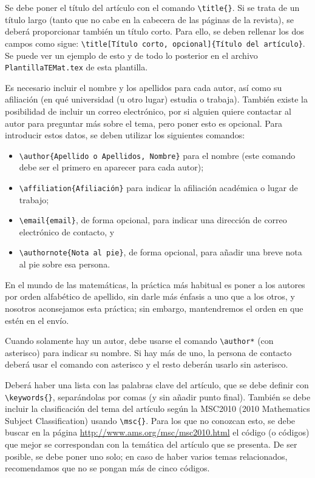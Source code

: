 \documentclass[bibtex, anon]{TEMat-article}
\begin{document}
Se debe poner el título del artículo con el comando \verb+\title{}+.
Si se trata de un título largo (tanto que no cabe en la cabecera de las páginas de la revista), se deberá proporcionar también un título corto.
Para ello, se deben rellenar los dos campos como sigue: \verb+\title[Título corto, opcional]{Título del artículo}+.
Se puede ver un ejemplo de esto y de todo lo posterior en el archivo \verb+PlantillaTEMat.tex+ de esta plantilla.

Es necesario incluir el nombre y los apellidos para cada autor, así como su afiliación (en qué universidad (u otro lugar) estudia o trabaja).
También existe la posibilidad de incluir un correo electrónico, por si alguien quiere contactar al autor para preguntar más sobre el tema, pero poner esto es opcional.
Para introducir estos datos, se deben utilizar los siguientes comandos:
\begin{itemize}
\item \verb+\author{Apellido o Apellidos, Nombre}+ para el nombre (este comando debe ser el primero en aparecer para cada autor);
\item \verb+\affiliation{Afiliación}+ para indicar la afiliación académica o lugar de trabajo;
\item \verb+\email{email}+, de forma opcional, para indicar una dirección de correo electrónico de contacto, y
\item \verb+\authornote{Nota al pie}+, de forma opcional, para añadir una breve nota al pie sobre esa persona.
\end{itemize}
En el mundo de las matemáticas, la práctica más habitual es poner a los autores por orden alfabético de apellido, sin darle más énfasis a uno que a los otros, y nosotros aconsejamos esta práctica; sin embargo, mantendremos el orden en que estén en el envío.

Cuando solamente hay un autor, debe usarse el comando \verb+\author*+ (con asterisco) para indicar su nombre. Si hay más de uno, la persona de contacto deberá usar el comando con asterisco y el resto deberán usarlo sin asterisco.

Deberá haber una lista con las palabras clave del artículo, que se debe definir con \verb+\keywords{}+, separándolas por comas (y sin añadir punto final).
También se debe incluir la clasificación del tema del artículo según la MSC2010 (2010 Mathematics Subject Classification) usando \verb+\msc{}+.
Para los que no conozcan esto, se debe buscar en la página \url{http://www.ams.org/msc/msc2010.html} el código (o códigos) que mejor se correspondan con la temática del artículo que se presenta.
De ser posible, se debe poner uno solo; en caso de haber varios temas relacionados, recomendamos que no se pongan más de cinco códigos.
\end{document}
